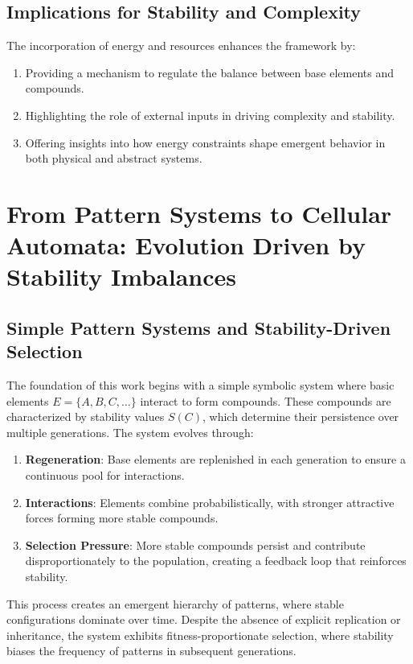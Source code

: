 \documentclass[entropy,article,submit,pdftex,moreauthors]{Definitions/mdpi}
\begin{document}
\subsection{Implications for Stability and Complexity}

The incorporation of energy and resources enhances the framework by:
\begin{enumerate}
    \item Providing a mechanism to regulate the balance between base elements and compounds.
    \item Highlighting the role of external inputs in driving complexity and stability.
    \item Offering insights into how energy constraints shape emergent behavior in both physical and abstract systems.
\end{enumerate}

\section{From Pattern Systems to Cellular Automata: Evolution Driven by Stability Imbalances}

\subsection{Simple Pattern Systems and Stability-Driven Selection}

The foundation of this work begins with a simple symbolic system where basic elements \( E = \{A, B, C, \ldots\} \) interact to form compounds. These compounds are characterized by stability values \( S(C) \), which determine their persistence over multiple generations. The system evolves through:
\begin{enumerate}
    \item \textbf{Regeneration}: Base elements are replenished in each generation to ensure a continuous pool for interactions.
    \item \textbf{Interactions}: Elements combine probabilistically, with stronger attractive forces forming more stable compounds.
    \item \textbf{Selection Pressure}: More stable compounds persist and contribute disproportionately to the population, creating a feedback loop that reinforces stability.
\end{enumerate}

This process creates an emergent hierarchy of patterns, where stable configurations dominate over time. Despite the absence of explicit replication or inheritance, the system exhibits fitness-proportionate selection, where stability biases the frequency of patterns in subsequent generations.
\end{document}
